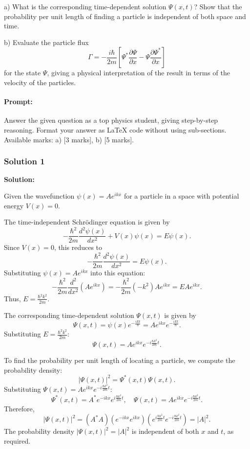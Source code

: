 \documentclass{article}
\begin{document}
a) What is the corresponding time-dependent solution $\Psi(x,t)$? Show that the probability per unit length of finding a particle is independent of both space and time.  

b) Evaluate the particle flux  
\[
\Gamma = -\frac{i \hbar}{2m} \left[ \Psi^* \frac{\partial \Psi}{\partial x} - \Psi \frac{\partial \Psi^*}{\partial x} \right]
\]
for the state $\Psi$, giving a physical interpretation of the result in terms of the velocity of the particles.


\paragraph{Prompt: \\} 
Answer the given question as a top physics student, giving step-by-step reasoning. Format your answer as LaTeX code without using sub-sections. Available marks: a) [3 marks], b) [5 marks].


\subsubsection{Solution 1}
\textbf{Solution:}  

Given the wavefunction $\psi(x) = A e^{ikx}$ for a particle in a space with potential energy $V(x) = 0$.  

The time-independent Schrödinger equation is given by  
\[
-\frac{\hbar^2}{2m} \frac{d^2 \psi(x)}{dx^2} + V(x)\psi(x) = E\psi(x).
\]  
Since $V(x) = 0$, this reduces to  
\[
-\frac{\hbar^2}{2m} \frac{d^2 \psi(x)}{dx^2} = E\psi(x).
\]  
Substituting $\psi(x) = A e^{ikx}$ into this equation:  
\[
-\frac{\hbar^2}{2m} \frac{d^2}{dx^2}\left(A e^{ikx}\right) = -\frac{\hbar^2}{2m}(-k^2)A e^{ikx} = E A e^{ikx}.
\]  
Thus, $E = \frac{\hbar^2 k^2}{2m}$.  

The corresponding time-dependent solution $\Psi(x,t)$ is given by  
\[
\Psi(x,t) = \psi(x) e^{-\frac{iEt}{\hbar}} = A e^{ikx} e^{-\frac{iEt}{\hbar}}.
\]  
Substituting $E = \frac{\hbar^2 k^2}{2m}$:  
\[
\Psi(x,t) = A e^{ikx} e^{-i \frac{\hbar k^2}{2m} t}.
\]  

To find the probability per unit length of locating a particle, we compute the probability density:  
\[
|\Psi(x,t)|^2 = \Psi^*(x,t) \Psi(x,t).
\]  
Substituting $\Psi(x,t) = A e^{ikx} e^{-i \frac{\hbar k^2}{2m} t}$:  
\[
\Psi^*(x,t) = A^* e^{-ikx} e^{i \frac{\hbar k^2}{2m} t}, \quad \Psi(x,t) = A e^{ikx} e^{-i \frac{\hbar k^2}{2m} t}.
\]  
Therefore,  
\[
|\Psi(x,t)|^2 = \left(A^* A\right) \left(e^{-ikx} e^{ikx}\right) \left(e^{i \frac{\hbar k^2}{2m} t} e^{-i \frac{\hbar k^2}{2m} t}\right) = |A|^2.
\]  
The probability density $|\Psi(x,t)|^2 = |A|^2$ is independent of both $x$ and $t$, as required.  
\end{document}
